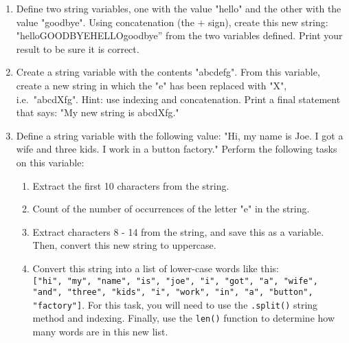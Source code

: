 \documentclass{article}[12pt]
\newcommand{\code}[1]{\texttt{#1}}  %
\begin{document}
\begin{enumerate}[itemsep=5ex]
	
	\item Define two string variables, one with the value "hello" and the other with the value "goodbye". Using concatenation (the $+$ sign), create this new string: "helloGOODBYEHELLOgoodbye'' from the two variables defined. Print your result to be sure it is correct.

	\item Create a string variable with the contents "abcdefg". From this variable, create a new string in which the "e" has been replaced with "X", i.e.\ "abcdXfg". Hint: use indexing and concatenation. Print a final statement that says: "My new string is abcdXfg."
	
	\item Define a string variable with the following value: "Hi, my name is Joe. I got a wife and three kids. I work in a button factory." Perform the following tasks on this variable:
	\begin{enumerate}[itemsep=2ex]
		
		\item Extract the first 10 characters from the string.
		\item Count of the number of occurrences of the letter "e" in the string.
		\item Extract characters 8 - 14 from the string, and save this as a variable. Then, convert this new string to uppercase.
		\item Convert this string into a list of lower-case words like this: \\ \code{["hi", "my", "name", "is", "joe", "i", "got", "a", "wife", "and", "three", "kids", "i", "work", "in", "a", "button", "factory"]}. For this task, you will need to use the \code{.split()} string method and indexing. Finally, use the \code{len()} function to determine how many words are in this new list.
		
	\end{enumerate}
	

	
\end{enumerate}
\end{document}
